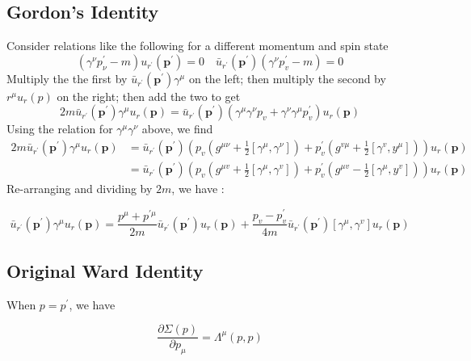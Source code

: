 \subsection{Gordon's Identity}
Consider relations like the following for a different momentum and spin state
$$\left(\gamma^{\nu} p_{\nu}^{\prime}-m\right) u_{r^{\prime}}\left(\mathbf{p}^{\prime}\right)=0\quad \bar{u}_{r^{\prime}}\left(\mathbf{p}^{\prime}\right)\left(\gamma^{\nu} p_{v}^{\prime}-m\right)=0
$$
Multiply the the first by $\bar{u}_{r^{\prime}}\left(\mathbf{p}^{\prime}\right) \gamma^{\mu}$ on the left; then multiply the second by $r^{\mu} u_{r}(p)$ on the right; then add the two to get
$$2 m \bar{u}_{r^{\prime}}\left(\mathbf{p}^{\prime}\right) \gamma^{\mu} u_{r}(\mathbf{p})=\bar{u}_{r^{\prime}}\left(\mathbf{p}^{\prime}\right)\left(\gamma^{\mu} \gamma^{\nu} p_{v}+\gamma^{\nu} \gamma^{\mu} p_{v}^{\prime}\right) u_{r}(\mathbf{p})$$
Using the relation for $\gamma^{\mu}\gamma^{\nu}$ above, we find
$$\begin{aligned}
2 m \bar{u}_{r^{\prime}}\left(\mathbf{p}^{\prime}\right) \gamma^{\mu} u_{r}(\mathbf{p}) &=\bar{u}_{r^{\prime}}\left(\mathbf{p}^{\prime}\right)\left(p_{v}\left(g^{\mu \nu}+\frac{1}{2}\left[\gamma^{\mu}, \gamma^{\nu}\right]\right)+p_{v}^{\prime}\left(g^{v \mu}+\frac{1}{2}\left[\gamma^{v}, y^{\mu}\right]\right)\right) u_{r}(\mathbf{p}) \\
&=\bar{u}_{r^{\prime}}\left(\mathbf{p}^{\prime}\right)\left(p_{v}\left(g^{\mu v}+\frac{1}{2}\left[\gamma^{\mu}, \gamma^{v}\right]\right)+p_{v}^{\prime}\left(g^{\mu v}-\frac{1}{2}\left[\gamma^{\mu}, y^{v}\right]\right)\right) u_{r}(\mathbf{p})
\end{aligned}$$
Re-arranging and dividing by $2m$, we have :
\begin{qt}
    \begin{equation}\bar{u}_{r^{\prime}}\left(\mathbf{p}^{\prime}\right) \gamma^{\mu} u_{r}(\mathbf{p})=\frac{p^{\mu}+p^{\prime \mu}}{2 m} \bar{u}_{r^{\prime}}\left(\mathbf{p}^{\prime}\right) u_{r}(\mathbf{p})+\frac{p_{v}-p_{v}^{\prime}}{4 m} \bar{u}_{r^{\prime}}\left(\mathbf{p}^{\prime}\right)\left[\gamma^{\mu}, \gamma^{v}\right] u_{r}(\mathbf{p})
    \label{gordon-identity}
    \end{equation}
\end{qt}
\subsection{Original Ward Identity}
When $p=p^{\prime}$, we have
\begin{qt}
    \begin{equation}\frac{\partial \Sigma(p)}{\partial p_{\mu}}=\Lambda^{\mu}(p, p)
    \label{original-ward-identity}
    \end{equation}
\end{qt}

